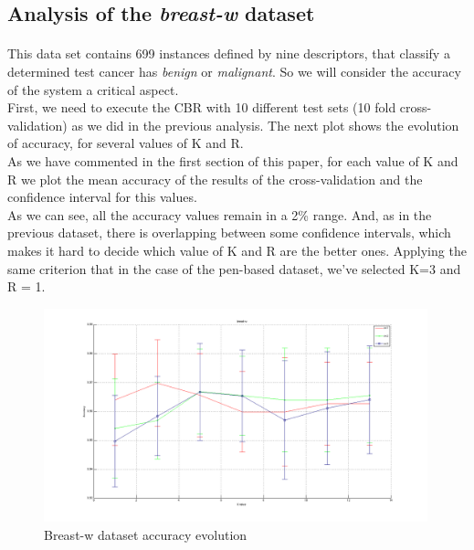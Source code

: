 \documentclass[12pt, a4paper]{article}
\begin{document}
\subsection{Analysis of the \emph{breast-w} dataset} %
\label{sub:analysis_of_the_breast-w_dataset}
\paragraph{}This data set contains 699 instances defined by nine descriptors, that classify a determined test cancer has \emph{benign} or \emph{malignant}. So we will consider the accuracy of the system a critical aspect.\\

First, we need to execute the CBR with 10 different test sets (10 fold cross-validation) as we did in the previous analysis. The next plot shows the evolution of accuracy, for several values of K and R.\\

As we have commented in the first section of this paper, for each value of K and R we plot the mean accuracy of the results of the cross-validation and the confidence interval for this values.\\

As we can see, all the accuracy values remain in a 2\% range. And, as in the previous dataset, there is overlapping between some confidence intervals, which makes it hard to decide which value of K and R are the better ones. Applying the same criterion that in the case of the pen-based dataset, we’ve selected K=3 and R = 1.\\

\begin{figure}[ht!]
	\centering
	\includegraphics[width=0.99\textwidth]{img/breast-w}
	\caption{Breast-w dataset accuracy evolution}
	\label{fig:breast-w}
\end{figure}
\end{document}
